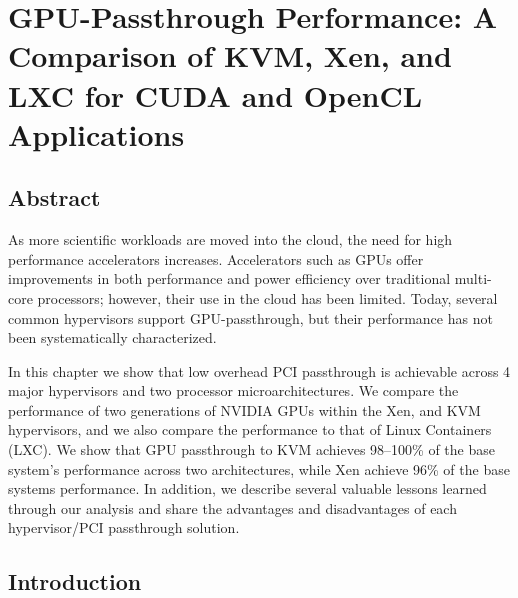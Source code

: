 
\chapter{GPU-Passthrough Performance: A Comparison of KVM, Xen, and LXC for CUDA and OpenCL Applications}
\label{chap:cloud2014}


\section{Abstract}
As more scientific workloads are moved into the cloud, the need for high
performance accelerators increases.  Accelerators such as GPUs offer
improvements in both performance and power efficiency over traditional
multi-core processors; however, their use in the cloud has been limited.  Today,
several common hypervisors support GPU-passthrough, but their performance has
not been systematically characterized.  

In this chapter we show that low overhead PCI passthrough is achievable across 4
major hypervisors and two processor microarchitectures. We compare the performance of two generations of NVIDIA
GPUs within the Xen,  and KVM hypervisors, and we also compare the
performance to that of Linux Containers (LXC). We show that GPU passthrough to
KVM achieves 98--100\% of the base system's performance across two
architectures, while Xen achieve 96\% of the base systems
performance.   In addition, we describe several
valuable lessons learned through our analysis and share the
advantages and disadvantages of each hypervisor/PCI passthrough solution. 


\section{Introduction}

